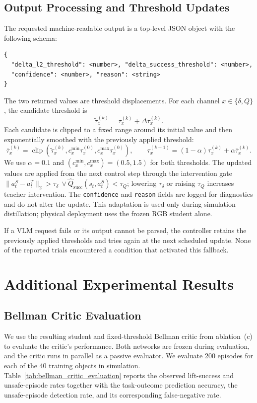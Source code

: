 \begin{samepage}
\subsection{Output Processing and Threshold Updates}
The requested machine-readable output is a top-level JSON object with the
following schema:
\begin{verbatim}
{
  "delta_l2_threshold": <number>, "delta_success_threshold": <number>,
  "confidence": <number>, "reason": <string>
}
\end{verbatim}
\end{samepage}
The two returned values are threshold displacements. For each channel
$x\in\{\delta,Q\}$, the candidate threshold is
\[
\tilde\tau_x^{(k)}=\tau_x^{(k)}+\Delta\tau_x^{(k)}.
\]
Each candidate is clipped to a fixed range around its initial value and then
exponentially smoothed with the previously applied threshold:
\[
\bar\tau_x^{(k)}=\operatorname{clip}\!\left(
\tilde\tau_x^{(k)},c_x^{\min}\tau_x^{(0)},
c_x^{\max}\tau_x^{(0)}\right),\qquad
\tau_x^{(k+1)}=(1-\alpha)\tau_x^{(k)}+\alpha\bar\tau_x^{(k)}.
\]
We use $\alpha=0.1$ and $(c_x^{\min},c_x^{\max})=(0.5,1.5)$ for both
thresholds. The updated values are applied from the next control step through
the intervention gate
$\lVert a_t^S-a_t^T\rVert_2>\tau_\delta\ \lor
\hat Q_{\mathrm{succ}}(s_t,a_t^S)<\tau_Q$; lowering $\tau_\delta$ or raising
$\tau_Q$ increases teacher intervention. The \texttt{confidence} and
\texttt{reason} fields are logged for diagnostics and do not alter the update.
This adaptation is used only during simulation distillation; physical
deployment uses the frozen RGB student alone.

If a VLM request fails or its output cannot be parsed, the controller retains
the previously applied thresholds and tries again at the next scheduled update.
None of the reported trials encountered a condition that activated this
fallback.

\section{Additional Experimental Results}
\label{app:additional_experimental_results}

\subsection{Bellman Critic Evaluation}
We use the resulting student and fixed-threshold Bellman critic from
ablation~(c) to evaluate the critic's performance. Both networks are frozen
during evaluation, and the critic runs in parallel as a passive evaluator. We
evaluate 200 episodes for each of the 40 training objects in simulation.
Table~\ref{tab:bellman_critic_evaluation} reports the observed lift-success and
unsafe-episode rates together with the task-outcome prediction accuracy, the
unsafe-episode detection rate, and its corresponding false-negative rate.

